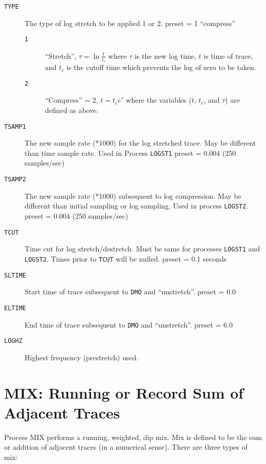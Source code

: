 \begin{description}
\item[\texttt{TYPE}] The type of log stretch to be applied 1 or 2.
         \Gls{preset} = 1 ``compress''
\begin{description}
    \item[\texttt{1}] ``Stretch'', $\tau = \ln{\frac{t}{t_{c}}}$ where $\tau$ is the new log time, $t$
        is time of trace, and $t_{c}$ is the cutoff time which prevents the
         log of zero to be taken.
     \item[\texttt{2}] ``Compress'' = 2, $t = t_{c} e^{\tau}$ where the variables ($t$, $t_{c}$,
         and $\tau$) are defined as above.
\end{description}

\item[\texttt{TSAMP1}] The new sample rate (*1000) for the log stretched trace.  May
         be different than time sample rate.   Used in Process \texttt{LOGST1}
         \Gls{preset} = 0.004  (250 samples/sec)

\item[\texttt{TSAMP2}] The new sample rate (*1000) subsequent to log compression.  May
         be different than initial sampling or log sampling.  Used in
         process \texttt{LOGST2}.
         \Gls{preset} = 0.004  (250 samples/sec)

\item[\texttt{TCUT}] Time cut for log stretch/destretch.  Must be same for processes
         \texttt{LOGST1} and \texttt{LOGST2}.  Times prior to \texttt{TCUT} will be nulled.
         \Gls{preset} = 0.1 seconds

\item[\texttt{SLTIME}] Start time of trace subsequent to \texttt{DMO} and ``unstretch''.
         \Gls{preset} = 0.0

\item[\texttt{ELTIME}] End time of trace subsequent to \texttt{DMO} and ``unstretch''.
         \Gls{preset} = 6.0

\item[\texttt{LOGHZ}] Highest frequency (prestretch) used.
\end{description}

\section{MIX: Running or Record Sum of Adjacent Traces}
\label{cmd_mix}

Process MIX performs a running, weighted, dip mix.  Mix is defined to be
the sum or addition of adjacent traces (in a numerical sense).   There
are three types of mix:

